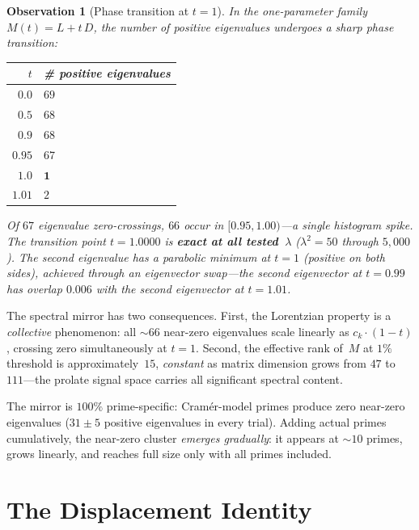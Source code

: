 \documentclass[11pt,a4paper]{article}
\newtheorem{observation}{Observation}[section]
\begin{document}
\begin{observation}[Phase transition at $t = 1$]\label{obs:phase}
In the one-parameter family $M(t) = L + t\,D$, the number of positive eigenvalues undergoes a sharp phase transition:

\begin{center}
\begin{tabular}{rl}
\toprule
$t$ & \# positive eigenvalues \\
\midrule
$0.0$ & $69$ \\
$0.5$ & $68$ \\
$0.9$ & $68$ \\
$0.95$ & $67$ \\
$1.0$ & $\mathbf{1}$ \\
$1.01$ & $2$ \\
\bottomrule
\end{tabular}
\end{center}

Of $67$ eigenvalue zero-crossings, $66$ occur in $[0.95, 1.00)$---a single histogram spike. The transition point $t = 1.0000$ is \textbf{exact at all tested~$\lambda$} ($\lambda^2 = 50$ through $5{,}000$). The second eigenvalue has a parabolic minimum at $t = 1$ (positive on both sides), achieved through an eigenvector swap---the second eigenvector at $t = 0.99$ has overlap $0.006$ with the second eigenvector at $t = 1.01$.
\end{observation}

The spectral mirror has two consequences. First, the Lorentzian property is a \emph{collective} phenomenon: all $\sim 66$ near-zero eigenvalues scale linearly as $c_k \cdot (1 - t)$, crossing zero simultaneously at $t = 1$. Second, the effective rank of~$M$ at $1\%$ threshold is approximately~$15$, \emph{constant} as matrix dimension grows from $47$ to $111$---the prolate signal space carries all significant spectral content.

The mirror is $100\%$ prime-specific: Cram\'er-model primes produce zero near-zero eigenvalues ($31 \pm 5$ positive eigenvalues in every trial). Adding actual primes cumulatively, the near-zero cluster \emph{emerges gradually}: it appears at $\sim 10$ primes, grows linearly, and reaches full size only with all primes included.

\section{The Displacement Identity}\label{sec:displacement}
\end{document}
